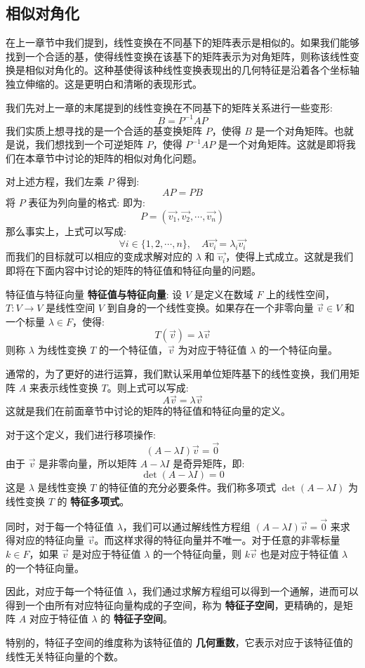 \documentclass[a4paper,12pt]{ctexart}
\begin{document}
\subsection{相似对角化}

在上一章节中我们提到，线性变换在不同基下的矩阵表示是相似的。如果我们能够找到一个合适的基，使得线性变换在该基下的矩阵表示为对角矩阵，则称该线性变换是相似对角化的。这种基使得该种线性变换表现出的几何特征是沿着各个坐标轴独立伸缩的。这是更明白和清晰的表现形式。

我们先对上一章的末尾提到的线性变换在不同基下的矩阵关系进行一些变形:
\[
B = P^{-1} A P
\]
我们实质上想寻找的是一个合适的基变换矩阵 $P$，使得 $B$ 是一个对角矩阵。也就是说，我们想找到一个可逆矩阵 $P$，使得 $P^{-1} A P$ 是一个对角矩阵。这就是即将我们在本章节中讨论的矩阵的相似对角化问题。

对上述方程，我们左乘 $P$ 得到:
\[
A P = P B
\]
将 $P$ 表征为列向量的格式: 即为:
\[P = (\vec{v_1}, \vec{v_2}, \cdots, \vec{v_n})\]
那么事实上，上式可以写成:
\[
\forall i \in \{1, 2, \cdots, n\}, \quad A \vec{v_i} = \lambda_i \vec{v_i}
\]
而我们的目标就可以相应的变成求解对应的 $\lambda$ 和 $\vec{v_i}$，使得上式成立。这就是我们即将在下面内容中讨论的矩阵的特征值和特征向量的问题。

\begin{mydef}{特征值与特征向量}{}
\textbf{特征值与特征向量}: 设 $V$ 是定义在数域 $F$ 上的线性空间，$T: V \to V$ 是线性空间 $V$ 到自身的一个线性变换。如果存在一个非零向量 $\vec{v} \in V$ 和一个标量 $\lambda \in F$，使得:
\[
T(\vec{v}) = \lambda \vec{v}
\]
则称 $\lambda$ 为线性变换 $T$ 的一个特征值，$\vec{v}$ 为对应于特征值 $\lambda$ 的一个特征向量。

通常的，为了更好的进行运算，我们默认采用单位矩阵基下的线性变换，我们用矩阵 $A$ 来表示线性变换 $T$。则上式可以写成:
\[
A \vec{v} = \lambda \vec{v}
\]
这就是我们在前面章节中讨论的矩阵的特征值和特征向量的定义。

对于这个定义，我们进行移项操作: 
\[
(A - \lambda I) \vec{v} = \vec{0}
\]
由于 $\vec{v}$ 是非零向量，所以矩阵 $A - \lambda I$ 是奇异矩阵，即:
\[
\det(A - \lambda I) = 0
\]
这是 $\lambda$ 是线性变换 $T$ 的特征值的充分必要条件。我们称多项式 $\det(A - \lambda I)$ 为线性变换 $T$ 的 \textbf{特征多项式}。

同时，对于每一个特征值 $\lambda$，我们可以通过解线性方程组 $(A - \lambda I) \vec{v} = \vec{0}$ 来求得对应的特征向量 $\vec{v}$。而这样求得的特征向量并不唯一。对于任意的非零标量 $k \in F$，如果 $\vec{v}$ 是对应于特征值 $\lambda$ 的一个特征向量，则 $k \vec{v}$ 也是对应于特征值 $\lambda$ 的一个特征向量。

因此，对应于每一个特征值 $\lambda$，我们通过求解方程组可以得到一个通解，进而可以得到一个由所有对应特征向量构成的子空间，称为 \textbf{特征子空间}，更精确的，是矩阵 $A$ 对应于特征值 $\lambda$ 的 \textbf{特征子空间}。

特别的，特征子空间的维度称为该特征值的 \textbf{几何重数}，它表示对应于该特征值的线性无关特征向量的个数。
\end{mydef}
\end{document}
